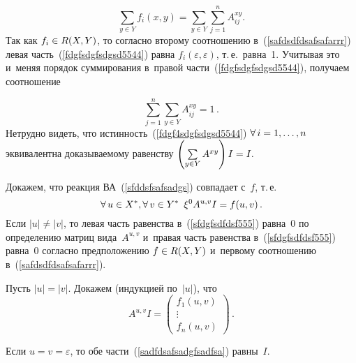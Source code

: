 \begin{multicols}{2}
\begin{itemize}
\noindent
\begin{equation}
\label{fdgfsdgfsdgsd5544}
\sum\limits_{y\in Y}f_i(x,y)=
\sum\limits_{y\in Y}\sum\limits_{j=1}^nA^{xy}_{ij}.
\end{equation}
Так как $f_i\hm\in R(X,Y)$, то согласно второму соотношению
в~(\ref{safdsdfdsafsafarrr})
левая часть~(\ref{fdgfsdgfsdgsd5544}) равна $f_i(\varepsilon,
\varepsilon)$, т.\,е.\ равна~1. Учитывая это и~меняя порядок
суммирования в~правой части~(\ref{fdgfsdgfsdgsd5544}), получаем
соотношение

\noindent
\begin{equation}
\label{fdgf4sdgfsdgsd5544}
\sum\limits_{j=1}^n\sum\limits_{y\in Y}A^{xy}_{ij}=1\,.
\end{equation}
Нетрудно видеть, что истинность~(\ref{fdgf4sdgfsdgsd5544})
$\forall\,i\hm=1,\ldots, n$ эквивалентна доказываемому равенству
$\left(\sum\limits_{y\in Y}A^{xy}\right)I\hm=I.$
\end{itemize}

Докажем, что реакция ВА~(\ref{sfddsfsafsadgs}) совпадает с~$f$, т.\,е.\
\begin{equation}
\label{sfdgfsdfdsf555}
\forall\,u\in X^*, \forall\,v\in Y^*\enskip
\xi^0A^{u,v}I = f(u,v)\,.
\end{equation}
Если $|u|\neq |v|$, то левая часть
равенства в~(\ref{sfdgfsdfdsf555}) равна~0 по определению матриц вида~$A^{u,v}$
и~правая часть равенства в~(\ref{sfdgfsdfdsf555}) равна~0
согласно предположению $f\hm\in R(X,Y)$ и~первому соотношению
в~(\ref{safdsdfdsafsafarrr}).

Пусть $|u|=|v|$. Докажем (индукцией по~$|u|$), что
\begin{equation}
\label{sadfdsafsadgfsadfsa}
A^{u,v}I=\begin{pmatrix}
f_1(u,v)\\
\vdots\\
f_n(u,v) \end{pmatrix}\,.
\end{equation}

Если $u=v=\varepsilon$, то обе части~(\ref{sadfdsafsadgfsadfsa})
равны~$I$.


\end{multicols}
